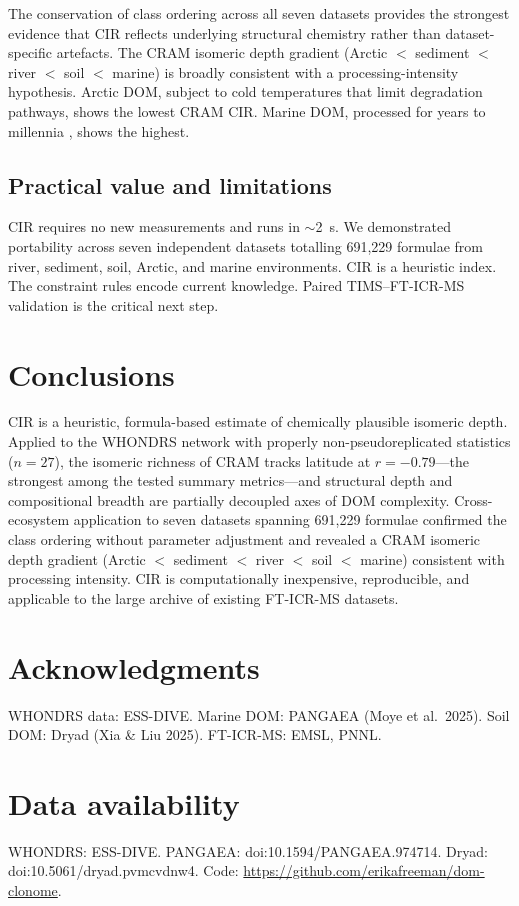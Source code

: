 \documentclass[12pt,letterpaper]{article}
\begin{document}
The conservation of class ordering across all seven datasets provides the strongest evidence that CIR reflects underlying structural chemistry rather than dataset-specific artefacts. The CRAM isomeric depth gradient (Arctic $<$ sediment $<$ river $<$ soil $<$ marine) is broadly consistent with a processing-intensity hypothesis. Arctic DOM, subject to cold temperatures that limit degradation pathways, shows the lowest CRAM CIR. Marine DOM, processed for years to millennia \citep{dittmar2014}, shows the highest.

\subsection{Practical value and limitations}

CIR requires no new measurements and runs in $\sim$2~s. We demonstrated portability across seven independent datasets totalling 691,229 formulae from river, sediment, soil, Arctic, and marine environments. CIR is a heuristic index. The constraint rules encode current knowledge. Paired TIMS--FT-ICR-MS validation is the critical next step.

\section{Conclusions}

CIR is a heuristic, formula-based estimate of chemically plausible isomeric depth. Applied to the WHONDRS network with properly non-pseudoreplicated statistics ($n = 27$), the isomeric richness of CRAM tracks latitude at $r = -0.79$---the strongest among the tested summary metrics---and structural depth and compositional breadth are partially decoupled axes of DOM complexity. Cross-ecosystem application to seven datasets spanning 691,229 formulae confirmed the class ordering without parameter adjustment and revealed a CRAM isomeric depth gradient (Arctic $<$ sediment $<$ river $<$ soil $<$ marine) consistent with processing intensity. CIR is computationally inexpensive, reproducible, and applicable to the large archive of existing FT-ICR-MS datasets.

\section*{Acknowledgments}
WHONDRS data: ESS-DIVE. Marine DOM: PANGAEA (Moye et al.\ 2025). Soil DOM: Dryad (Xia \& Liu 2025). FT-ICR-MS: EMSL, PNNL.

\section*{Data availability}
WHONDRS: ESS-DIVE. PANGAEA: doi:10.1594/PANGAEA.974714. Dryad: doi:10.5061/dryad.pvmcvdnw4. Code: \url{https://github.com/erikafreeman/dom-clonome}.
\end{document}
